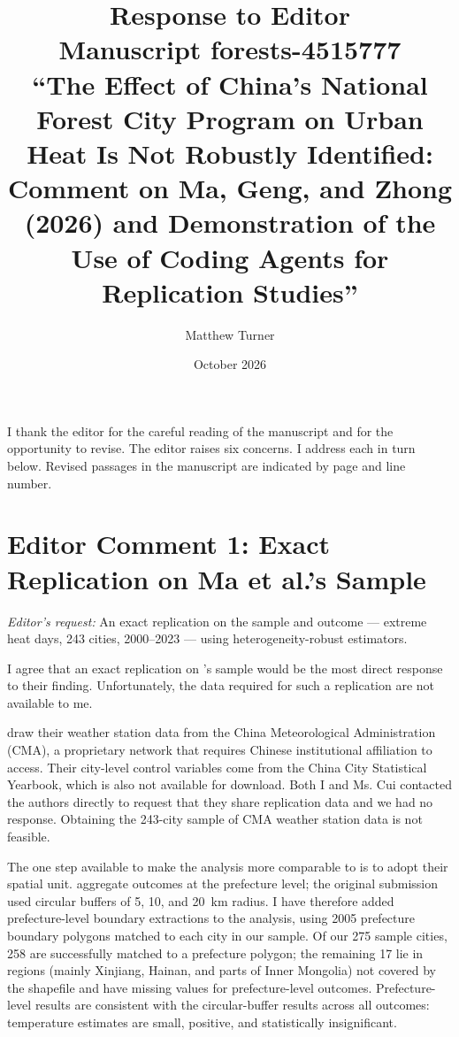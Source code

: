 \documentclass[12pt]{article}
\title{Response to Editor\\
       \large Manuscript forests-4515777\\
       \large ``The Effect of China's National Forest City Program on Urban
       Heat Is Not Robustly Identified: Comment on Ma, Geng, and Zhong
       (2026) and Demonstration of the Use of Coding Agents for Replication
       Studies''}
\author{Matthew Turner}
\date{October 2026}
\begin{document}
\maketitle

\noindent
I thank the editor for the careful reading of the manuscript and for the
opportunity to revise.  The editor raises six concerns.  I address each
in turn below.  Revised passages in the manuscript are indicated by page
and line number.

\section*{Editor Comment 1: Exact Replication on Ma et al.'s Sample}

\noindent\textit{Editor's request:} An exact replication on the
\citet{Ma2026} sample and outcome --- extreme heat days, 243 cities,
2000--2023 --- using heterogeneity-robust estimators.

\bigskip\noindent
I agree that an exact replication on \citeauthor{Ma2026}'s sample
would be the most direct response to their finding.  Unfortunately, the
data required for such a replication are not available to me.

\citet{Ma2026} draw their weather station data from the China
Meteorological Administration (CMA), a proprietary network that requires
Chinese institutional affiliation to access.  Their city-level
control variables come from the China City Statistical Yearbook, which is
also not available for download.  Both I and Ms. Cui contacted the authors directly to request that they share replication data and we had no response. Obtaining the 243-city sample of CMA weather station data is not feasible.

The one step available to make the analysis more comparable to
\citeauthor{Ma2026} is to adopt their spatial unit.  \citeauthor{Ma2026}
aggregate outcomes at the prefecture level; the original submission used
circular buffers of 5, 10, and 20~km radius.  I have therefore added
prefecture-level boundary extractions to the analysis, using 2005
prefecture boundary polygons matched to each city in our
sample.  Of our 275 sample cities, 258 are successfully matched to a
prefecture polygon; the remaining 17 lie in regions (mainly Xinjiang,
Hainan, and parts of Inner Mongolia) not covered by the shapefile and
have missing values for prefecture-level outcomes.  Prefecture-level
results are consistent with the circular-buffer results across all
outcomes: temperature estimates are small, positive, and statistically
insignificant.
\end{document}

